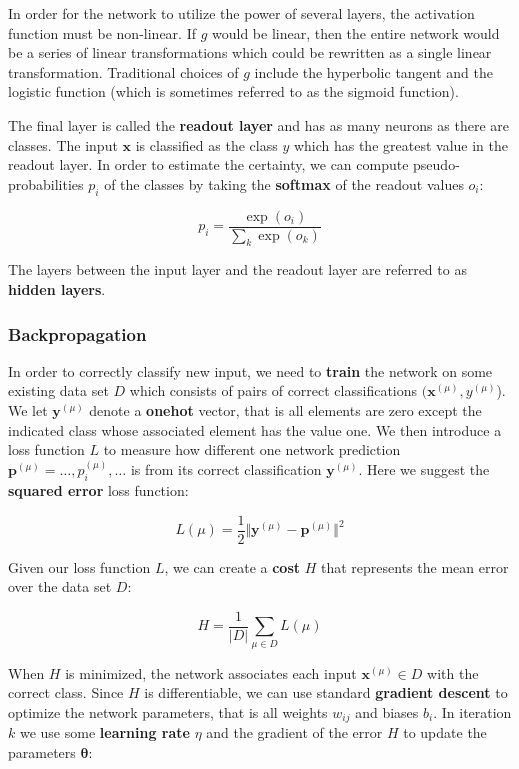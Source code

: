In order for the network to utilize the power of several layers, the activation function must be non-linear. If $g$ would be linear, then the entire network would be a series of linear transformations which could be rewritten as a single linear transformation. Traditional choices of $g$ include the hyperbolic tangent and the logistic function (which is sometimes referred to as the sigmoid function).

The final layer is called the \textbf{readout layer} and has as many neurons as there are classes. The input $\mathbf{x}$ is classified as the class $y$ which has the greatest value in the readout layer. In order to estimate the certainty, we can compute pseudo-probabilities $p_i$ of the classes by taking the \textbf{softmax} of the readout values $o_i$:

\[
p_i = \frac{ \exp(o_i) }{ \sum_k \exp(o_k) }
\]

The layers between the input layer and the readout layer are referred to as \textbf{hidden layers}.

\subsubsection{Backpropagation} \label{sssec:BackProp}

In order to correctly classify new input, we need to \textbf{train} the network on some existing data set $D$ which consists of pairs of correct classifications $(\mathbf{x}^{(\mu)}, y^{(\mu)}$).
We let $\mathbf{y}^{(\mu)}$ denote a \textbf{onehot} vector, that is all elements are zero except the indicated class whose associated element has the value one.
We then introduce a loss function $L$ to measure how different one network prediction $\mathbf{p}^{(\mu)}={\ldots, p_i^{(\mu)}, \ldots}$ is from its correct classification $\mathbf{y}^{(\mu)}$. Here we suggest the \textbf{squared error} loss function:

\[
L(\mu) = \frac{1}{2} \Vert
  \mathbf{y}^{(\mu)} - \mathbf{p}^{(\mu)}
\Vert ^2
\]

Given our loss function $L$, we can create a \textbf{cost} $H$ that represents the mean error over the data set $D$:

\[
H = \frac{1}{\vert D \vert} \sum_{\mu \in D} L(\mu)
\]

When $H$ is minimized, the network associates each input $\mathbf{x}^{(\mu)} \in D$ with the correct class. Since $H$ is differentiable, we can use standard \textbf{gradient descent} to optimize the network parameters, that is all weights $w_{ij}$ and biases $b_i$.
In iteration $k$ we use some \textbf{learning rate} $\eta$ and the gradient of the error $H$ to update the parameters $\mathbf{\theta}$:

